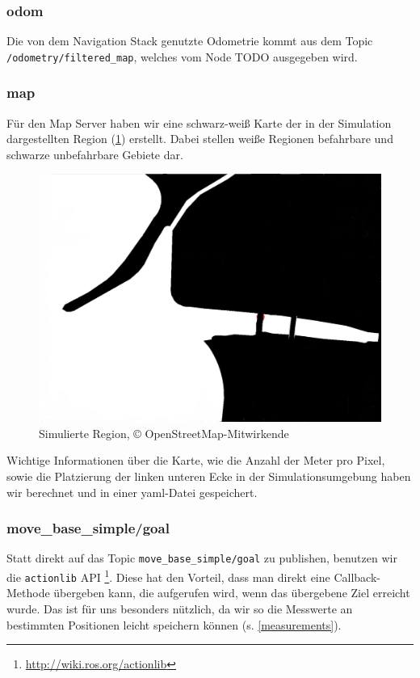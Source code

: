 \documentclass[11pt]{article}
\begin{document}
\subsubsection{odom}
Die von dem Navigation Stack genutzte Odometrie kommt aus dem Topic \texttt{/odometry/filtered\_map}, welches vom Node TODO ausgegeben wird.

\subsubsection{map}

Für den Map Server haben wir eine schwarz-weiß Karte der in der Simulation dargestellten Region (\ref{diluvio}) erstellt. Dabei stellen weiße Regionen befahrbare und schwarze unbefahrbare Gebiete dar.

\begin{figure}[h]
	\centering
	\includegraphics[width=0.7\linewidth]{diluvio.jpg}
	\caption{Simulierte Region, © OpenStreetMap-Mitwirkende}
	\label{diluvio}
\end{figure}

Wichtige Informationen über die Karte, wie die Anzahl der Meter pro Pixel, sowie die Platzierung der linken unteren Ecke in der Simulationsumgebung haben wir berechnet und in einer yaml-Datei gespeichert.

\subsubsection{move\_base\_simple/goal} \label{goal}
Statt direkt auf das Topic \texttt{move\_base\_simple/goal} zu publishen, benutzen wir die \texttt{actionlib} API \footnote{\url{http://wiki.ros.org/actionlib}}. Diese hat den Vorteil, dass man direkt eine Callback-Methode übergeben kann, die aufgerufen wird, wenn das übergebene Ziel erreicht wurde. Das ist für uns besonders nützlich, da wir so die Messwerte an bestimmten Positionen leicht speichern können (s. \ref{measurements}).
\end{document}
